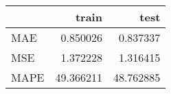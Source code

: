 \begin{tabular}{lrr}
\toprule
{} &      train &       test \\
\midrule
MAE  &   0.850026 &   0.837337 \\
MSE  &   1.372228 &   1.316415 \\
MAPE &  49.366211 &  48.762885 \\
\bottomrule
\end{tabular}
